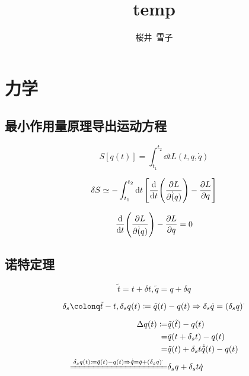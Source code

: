 \documentclass{article}
\title{temp}
\author{桜井\ 雪子}
\begin{document}
\maketitle

\section{力学}

\subsection{最小作用量原理导出运动方程}

\[ S[q(t)] = \int_{t_1}^{t_2} \dd{t} L(t, q, \dot{q}) \]

\[ \delta S \simeq - \int_{t_1}^{t_2} \dd{t} \qty[\dv{t} \qty(\pdv{L}{\dot(q)}) - \pdv{L}{q}] \]

\[ \dv{t} \qty(\pdv{L}{\dot(q)}) - \pdv{L}{q} = 0 \]

\subsection{诺特定理}

\[ \tilde{t} = t + \delta t, \tilde{q} = q + \delta q \]

\[ \delta_s \colonq \tilde{t} - t, \delta_s q(t) \coloneq \tilde{q}(t) - q(t) \Rightarrow \delta_s \dot{q} = (\delta_s q)^{\cdot} \]

\begin{align*}
    \Delta q(t) \coloneq                                                                                                 & \tilde{q}(\tilde{t}) - q(t)                         \\
    =                                                                                                                    & \tilde{q}(t + \delta_s t) - q(t)                    \\
    =                                                                                                                    & \tilde{q}(t) + \delta_s t \dot{\tilde{q}}(t) - q(t) \\
    \xlongequal{\delta_s q(t) \coloneq \tilde{q}(t) - q(t) \Rightarrow \dot{\tilde{q}} = \dot{q} + (\delta_s q)^{\cdot}} & \delta_s q + \delta_s t \dot{q}
\end{align*}
\end{document}
